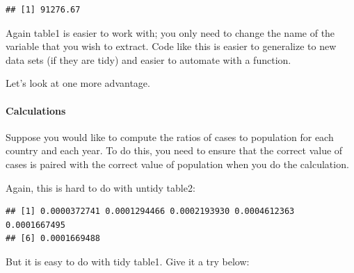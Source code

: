 \documentclass[
]{article}
\newenvironment{Shaded}{\begin{snugshade}}{\end{snugshade}}
\newcommand{\DecValTok}[1]{\textcolor[rgb]{0.00,0.00,0.81}{#1}}
\newcommand{\FunctionTok}[1]{\textcolor[rgb]{0.00,0.00,0.00}{#1}}
\newcommand{\NormalTok}[1]{#1}
\newcommand{\SpecialCharTok}[1]{\textcolor[rgb]{0.00,0.00,0.00}{#1}}
\begin{document}
\begin{verbatim}
## [1] 91276.67
\end{verbatim}

Again table1 is easier to work with; you only need to change the name of
the variable that you wish to extract. Code like this is easier to
generalize to new data sets (if they are tidy) and easier to automate
with a function.

Let's look at one more advantage.

\hypertarget{calculations}{%
\paragraph{Calculations}\label{calculations}}

Suppose you would like to compute the ratios of cases to population for
each country and each year. To do this, you need to ensure that the
correct value of cases is paired with the correct value of population
when you do the calculation.

Again, this is hard to do with untidy table2:

\begin{Shaded}
\end{Shaded}

\begin{verbatim}
## [1] 0.0000372741 0.0001294466 0.0002193930 0.0004612363 0.0001667495
## [6] 0.0001669488
\end{verbatim}

But it is easy to do with tidy table1. Give it a try below:

\begin{Shaded}
\end{Shaded}
\end{document}
